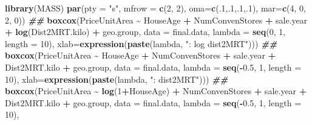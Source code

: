 \documentclass[
]{book}
\newenvironment{Shaded}{\begin{snugshade}}{\end{snugshade}}
\newcommand{\AttributeTok}[1]{\textcolor[rgb]{0.13,0.29,0.53}{#1}}
\newcommand{\DecValTok}[1]{\textcolor[rgb]{0.00,0.00,0.81}{#1}}
\newcommand{\DocumentationTok}[1]{\textcolor[rgb]{0.56,0.35,0.01}{\textbf{\textit{#1}}}}
\newcommand{\FloatTok}[1]{\textcolor[rgb]{0.00,0.00,0.81}{#1}}
\newcommand{\FunctionTok}[1]{\textcolor[rgb]{0.13,0.29,0.53}{\textbf{#1}}}
\newcommand{\NormalTok}[1]{#1}
\newcommand{\SpecialCharTok}[1]{\textcolor[rgb]{0.81,0.36,0.00}{\textbf{#1}}}
\newcommand{\StringTok}[1]{\textcolor[rgb]{0.31,0.60,0.02}{#1}}
\begin{document}
\begin{Shaded}
\begin{Highlighting}[]
\FunctionTok{library}\NormalTok{(MASS)}
\FunctionTok{par}\NormalTok{(}\AttributeTok{pty =} \StringTok{"s"}\NormalTok{, }\AttributeTok{mfrow =} \FunctionTok{c}\NormalTok{(}\DecValTok{2}\NormalTok{, }\DecValTok{2}\NormalTok{), }\AttributeTok{oma=}\FunctionTok{c}\NormalTok{(.}\DecValTok{1}\NormalTok{,.}\DecValTok{1}\NormalTok{,.}\DecValTok{1}\NormalTok{,.}\DecValTok{1}\NormalTok{), }\AttributeTok{mar=}\FunctionTok{c}\NormalTok{(}\DecValTok{4}\NormalTok{, }\DecValTok{0}\NormalTok{, }\DecValTok{2}\NormalTok{, }\DecValTok{0}\NormalTok{))}
\DocumentationTok{\#\#}
\FunctionTok{boxcox}\NormalTok{(PriceUnitArea }\SpecialCharTok{\textasciitilde{}}\NormalTok{ HouseAge }\SpecialCharTok{+}\NormalTok{ NumConvenStores }\SpecialCharTok{+}\NormalTok{ sale.year }\SpecialCharTok{+}  \FunctionTok{log}\NormalTok{(Dist2MRT.kilo)  }
       \SpecialCharTok{+}\NormalTok{ geo.group, }\AttributeTok{data =}\NormalTok{ final.data, }\AttributeTok{lambda =} \FunctionTok{seq}\NormalTok{(}\DecValTok{0}\NormalTok{, }\DecValTok{1}\NormalTok{, }\AttributeTok{length =} \DecValTok{10}\NormalTok{), }
       \AttributeTok{xlab=}\FunctionTok{expression}\NormalTok{(}\FunctionTok{paste}\NormalTok{(lambda, }\StringTok{": log dist2MRT"}\NormalTok{)))}
\DocumentationTok{\#\#}
\FunctionTok{boxcox}\NormalTok{(PriceUnitArea }\SpecialCharTok{\textasciitilde{}}\NormalTok{ HouseAge }\SpecialCharTok{+}\NormalTok{ NumConvenStores }\SpecialCharTok{+}\NormalTok{ sale.year }\SpecialCharTok{+}\NormalTok{  Dist2MRT.kilo  }\SpecialCharTok{+} 
\NormalTok{       geo.group, }\AttributeTok{data =}\NormalTok{ final.data, }\AttributeTok{lambda =} \FunctionTok{seq}\NormalTok{(}\SpecialCharTok{{-}}\FloatTok{0.5}\NormalTok{, }\DecValTok{1}\NormalTok{, }\AttributeTok{length =} \DecValTok{10}\NormalTok{), }
       \AttributeTok{xlab=}\FunctionTok{expression}\NormalTok{(}\FunctionTok{paste}\NormalTok{(lambda, }\StringTok{": dist2MRT"}\NormalTok{)))}
\DocumentationTok{\#\#}
\FunctionTok{boxcox}\NormalTok{(PriceUnitArea }\SpecialCharTok{\textasciitilde{}} \FunctionTok{log}\NormalTok{(}\DecValTok{1}\SpecialCharTok{+}\NormalTok{HouseAge) }\SpecialCharTok{+}\NormalTok{ NumConvenStores }\SpecialCharTok{+}\NormalTok{ sale.year }\SpecialCharTok{+}\NormalTok{  Dist2MRT.kilo  }\SpecialCharTok{+} 
\NormalTok{      geo.group, }\AttributeTok{data =}\NormalTok{ final.data, }\AttributeTok{lambda =} \FunctionTok{seq}\NormalTok{(}\SpecialCharTok{{-}}\FloatTok{0.5}\NormalTok{, }\DecValTok{1}\NormalTok{, }\AttributeTok{length =} \DecValTok{10}\NormalTok{), }

\end{Highlighting}
\end{Shaded}
\end{document}
